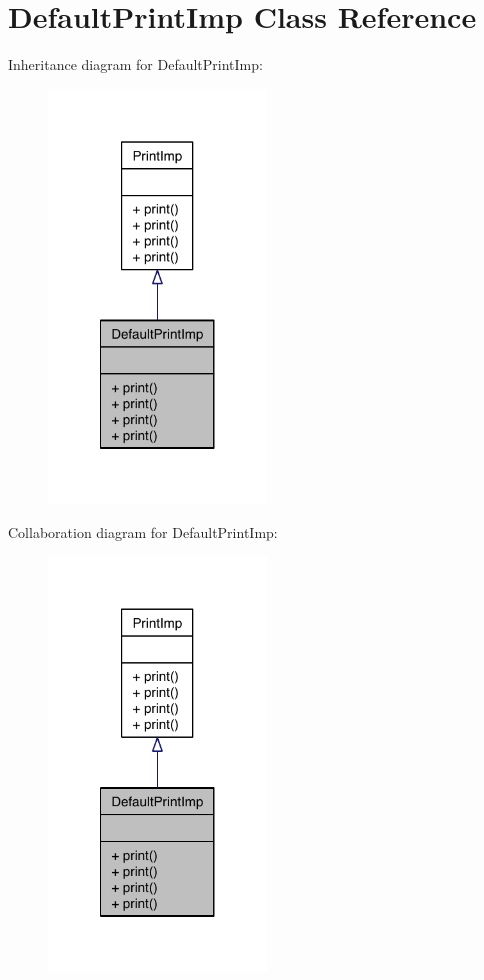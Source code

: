 \hypertarget{class_default_print_imp}{\section{Default\-Print\-Imp Class Reference}
\label{class_default_print_imp}
}


Inheritance diagram for Default\-Print\-Imp\-:\nopagebreak
\begin{figure}[H]
\begin{center}
\leavevmode
\includegraphics[width=164pt]{class_default_print_imp__inherit__graph}
\end{center}
\end{figure}


Collaboration diagram for Default\-Print\-Imp\-:\nopagebreak
\begin{figure}[H]
\begin{center}
\leavevmode
\includegraphics[width=164pt]{class_default_print_imp__coll__graph}
\end{center}
\end{figure}
